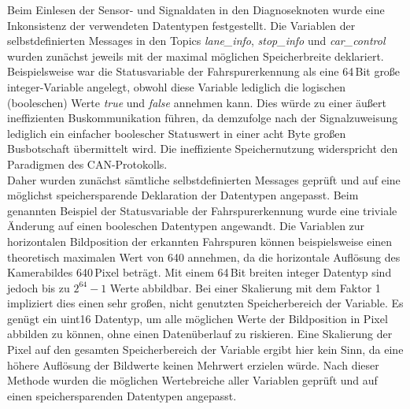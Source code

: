 Beim Einlesen der Sensor- und Signaldaten in den Diagnoseknoten wurde eine Inkonsistenz der verwendeten Datentypen festgestellt. Die Variablen der selbstdefinierten Messages in den Topics \emph{lane\_info}, \emph{stop\_info} und \emph{car\_control} wurden zunächst jeweils mit der maximal möglichen Speicherbreite deklariert. Beispielsweise war die Statusvariable der Fahrspurerkennung als eine 64\,Bit große integer-Variable angelegt, obwohl diese Variable lediglich die logischen (booleschen) Werte \emph{true} und \emph{false} annehmen kann. Dies würde zu einer äußert ineffizienten Buskommunikation führen, da demzufolge nach der Signalzuweisung lediglich ein einfacher boolescher Statuswert in einer acht Byte großen Busbotschaft übermittelt wird. Die ineffiziente Speichernutzung widerspricht den Paradigmen des CAN-Protokolls.\\
Daher wurden zunächst sämtliche selbstdefinierten Messages geprüft und auf eine möglichst speichersparende Deklaration der Datentypen angepasst. Beim genannten Beispiel der Statusvariable der Fahrspurerkennung wurde eine triviale Änderung auf einen booleschen Datentypen angewandt. Die Variablen zur horizontalen Bildposition der erkannten Fahrspuren können beispielsweise einen theoretisch maximalen Wert von 640 annehmen, da die horizontale Auflösung des Kamerabildes 640\,Pixel beträgt. Mit einem 64\,Bit breiten integer Datentyp sind jedoch bis zu $2^{64}-1$ Werte abbildbar. Bei einer Skalierung mit dem Faktor 1 impliziert dies einen sehr großen, nicht genutzten Speicherbereich der Variable. Es genügt ein uint16 Datentyp, um alle möglichen Werte der Bildposition in Pixel abbilden zu können, ohne einen Datenüberlauf zu riskieren. Eine Skalierung der Pixel auf den gesamten Speicherbereich der Variable ergibt hier kein Sinn, da eine höhere Auflösung der Bildwerte keinen Mehrwert erzielen würde. Nach dieser Methode wurden die möglichen Wertebreiche aller Variablen geprüft und auf einen speichersparenden Datentypen angepasst. 


